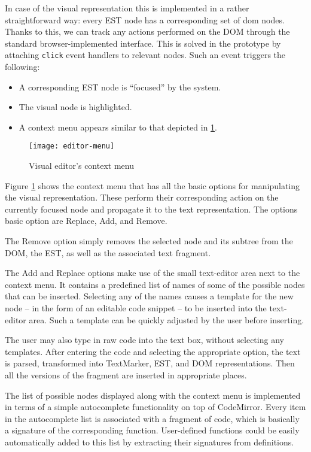In case of the visual representation this is implemented in a rather
straightforward way: every EST node has a corresponding set of \acrshort{dom}
nodes. Thanks to this, we can track any actions performed on the DOM through the
standard browser-implemented interface. This is solved in the prototype by
attaching \texttt{click} event handlers to relevant nodes. Such an event
triggers the following:
\begin{itemize}
    \item A corresponding EST node is ``focused'' by the system.
    \item The visual node is highlighted.
    \item A context menu appears similar to that depicted in
      \ref{fig:editor-menu}.
\end{itemize}

\begin{figure}[h!]
\centering \texttt{[image: editor-menu]}
\caption{Visual editor's context menu}
\label{fig:editor-menu}
\end{figure}

Figure \ref{fig:editor-menu} shows the context menu that has all the basic options for manipulating the visual representation. These perform their corresponding action on the currently focused node and propagate it to the text representation. The options basic option are Replace, Add, and Remove.

The Remove option simply removes the selected node and its subtree from the
DOM, the EST, as well as the associated text fragment.

The Add and Replace options make use of the small text-editor area next to the context menu. It contains a predefined list of names of some of the possible nodes that can be inserted. Selecting any of the names causes a template for the new node -- in the form of an editable code snippet -- to be inserted into the text-editor area. Such a template can be quickly adjusted by the user before inserting.

The user may also type in raw code into the text box, without selecting any templates. After entering the code and selecting the appropriate option, the text is parsed, transformed into TextMarker, EST, and DOM representations. Then all the versions of the fragment are inserted in appropriate places.

The list of possible nodes displayed along with the context menu is implemented
in terms of a simple autocomplete functionality on top of CodeMirror. Every item
in the autocomplete list is associated with a fragment of code, which is
basically a signature of the corresponding function. User-defined functions
could be easily automatically added to this list by extracting their signatures
from definitions.


